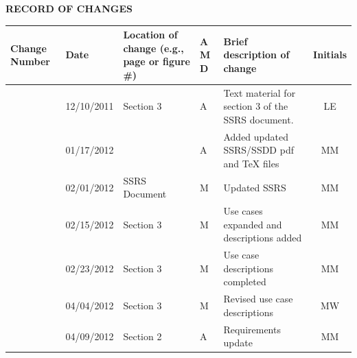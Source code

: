 \documentclass[twoside,letterpaper]{article}
\begin{document}


\bigskip





{\centering\bfseries RECORD OF CHANGES \par}


\bigskip

\begin{flushleft}
\tablehead{}
\begin{supertabular}[c]{|m{0.75in}|m{1.0in}|m{1.5in}|m{0.25in}|m{2in}|c|}
\hline

\centering \bfseries Change
\centering \bfseries Number
&

\centering \bfseries Date
\par
&

\centering \bfseries Location of change\newline
\centering \bfseries(e.g., page or figure \#)
&

\centering \bfseries A\newline
\centering \bfseries M\newline
\centering \bfseries D  
&

\centering \bfseries Brief description\newline
\centering \bfseries of change
&
\bfseries Initials
\\\hline

& 12/10/2011
& Section 3
& \centering A
& Text material for section 3 of the SSRS document.
& LE

\\\hline
{}
& 01/17/2012
& ~
& \centering A
& Added updated SSRS/SSDD pdf and TeX files
& MM

\\\hline
{}
& 02/01/2012
& SSRS Document
& \centering M
& Updated SSRS
& MM

\\\hline
{}
& 02/15/2012
& Section 3
& \centering M
& Use cases expanded and descriptions added
& MM

\\\hline
{}
& 02/23/2012
& Section 3
& \centering M
& Use case descriptions completed
& MM

\\\hline
{}
& 04/04/2012
& Section 3
& \centering M
& Revised use case descriptions
& MW

\\\hline
{}
& 04/09/2012
& Section 2
& \centering A
& Requirements update
& MM


\end{supertabular}
\end{flushleft}
\end{document}
